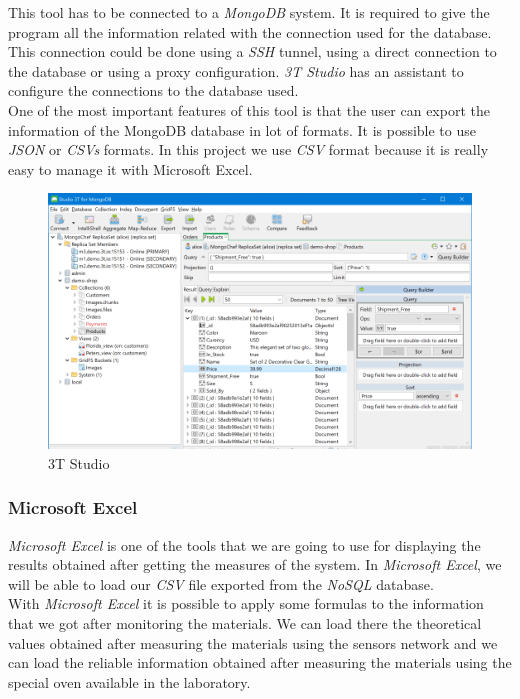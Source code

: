 This tool has to be connected to a \textit{MongoDB} system. It is required to give the program all the information related with the connection used for the database. This connection could be done using a \textit{SSH} tunnel, using a direct connection to the database or using a proxy configuration. \textit{3T Studio} has an assistant to configure the connections to the database used.\\

One of the most important features of this tool is that the user can export the information of the MongoDB database in lot of formats. It is possible to use \textit{JSON} or \textit{CSVs} formats. In this project we use \textit{CSV} format because it is really easy to manage it with Microsoft Excel.

\begin{figure}[H]
\begin{centering}
\includegraphics[scale=0.4]{IMGS/3T_STUDIO.png}
\caption{3T Studio \label{3T_STUDIO}}
\end{centering}
\end{figure}

\subsubsection{Microsoft Excel}

\textit{Microsoft Excel} is one of the tools that we are going to use for displaying the results obtained after getting the measures of the system. In \textit{Microsoft Excel}, we will be able to load our \textit{CSV} file exported from the \textit{NoSQL} database.\\

With \textit{Microsoft Excel} it is possible to apply some formulas to the information that we got after monitoring the materials. We can load there the theoretical values obtained after measuring the materials using the sensors network and we can load the reliable information obtained after measuring the materials using the special oven available in the laboratory.\\

